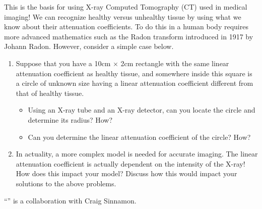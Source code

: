 \vfill

This is the basis for using X-ray Computed Tomography (CT) used in medical imaging! We can recognize healthy versus unhealthy tissue by using what we know about their attenuation coefficients. To do this in a human body requires more advanced mathematics such as the Radon transform introduced in 1917 by Johann Radon. However, consider a simple case below.

\vfill

\begin{enumerate}[resume,label=\emph{\arabic*.}]
\item Suppose that you have a 10cm $\times$ 2cm rectangle with the same linear attenuation coefficient as healthy tissue, and somewhere inside this square is a circle of unknown size having a linear attenuation coefficient different from that of healthy tissue.
\begin{itemize}
\item  Using an X-ray tube and an X-ray detector, can you locate the circle and determine its radius? How?
\item  Can you determine the linear attenuation coefficient of the circle? How?
 \end{itemize}

 \vfill
 
 \item In actuality, a more complex model is needed for accurate imaging. The linear attenuation coefficient is actually dependent on the intensity of the X-ray! How does this impact your model? Discuss how this would impact your solutions to the above problems.

\end{enumerate}

\vfill

\begin{graybox}
\hfill ``\xraytitle'' is a collaboration with Craig Sinnamon.
\end{graybox}

\begin{noexercises}
\end{noexercises}
